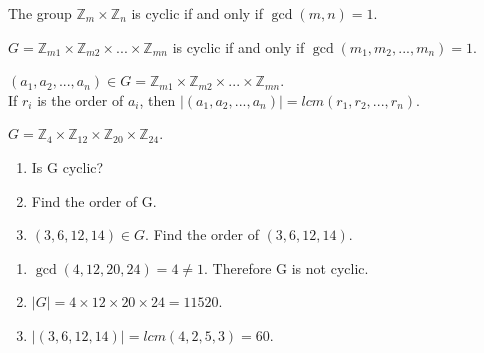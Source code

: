 \begin{theorem}
    The group $\mathbb{Z}_m \times \mathbb{Z}_n$ is cyclic if and only if $\gcd(m, n) = 1$.
\end{theorem}

\begin{corollary}
    $G = \mathbb{Z}_{m1} \times \mathbb{Z}_{m2} \times ... \times \mathbb{Z}_{mn}$ is cyclic if and only if $\gcd(m_1, m_2, ..., m_n) = 1$.
\end{corollary}

\begin{theorem}
    $(a_1, a_2, ..., a_n) \in G = \mathbb{Z}_{m1} \times \mathbb{Z}_{m2} \times ... \times \mathbb{Z}_{mn}$.\\
    If $r_i$ is the order of $a_i$, then $| (a_1, a_2, ..., a_n) | = lcm(r_1, r_2, ..., r_n)$.
\end{theorem}

\begin{exercise}
    $G = \mathbb{Z}_4 \times \mathbb{Z}_{12} \times \mathbb{Z}_{20} \times \mathbb{Z}_{24}$.\\
    \begin{enumerate}
        \item Is G cyclic?
        \item Find the order of G.
        \item $(3, 6, 12, 14) \in G$. Find the order of $(3, 6, 12, 14)$.
    \end{enumerate}
\end{exercise}
\begin{answer}
    \begin{enumerate}
        \item $\gcd(4, 12, 20, 24) = 4 \neq 1$. Therefore G is not cyclic.
        \item $|G| = 4 \times 12 \times 20 \times 24 = 11520$.
        \item  $| (3, 6, 12, 14) | = lcm(4, 2, 5, 3) = 60$.
    \end{enumerate}
\end{answer}


